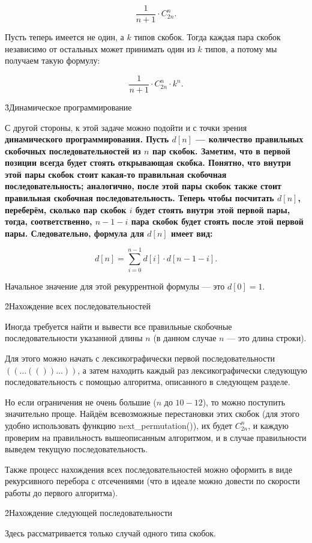 $$ \frac{1}{n+1} \cdot C^n_{2n}. $$

Пусть теперь имеется не один, а $k$ типов скобок. Тогда каждая пара скобок независимо от остальных может принимать один из $k$ типов, а потому мы получаем такую формулу:

$$ \frac{1}{n+1} \cdot C^n_{2n} \cdot k^n. $$

\h3{Динамическое программирование}

С другой стороны, к этой задаче можно подойти и с точки зрения \bf{динамического программирования}. Пусть $d[n]$ --- количество правильных скобочных последовательностей из $n$ пар скобок. Заметим, что в первой позиции всегда будет стоять открывающая скобка. Понятно, что внутри этой пары скобок стоит какая-то правильная скобочная последовательность; аналогично, после этой пары скобок также стоит правильная скобочная последовательность. Теперь чтобы посчитать $d[n]$, переберём, сколько пар скобок $i$ будет стоять внутри этой первой пары, тогда, соответственно, $n-1-i$ пара скобок будет стоять после этой первой пары. Следовательно, формула для $d[n]$ имеет вид:

$$ d[n] = \sum_{i=0}^{n-1} d[i] \cdot d[n-1-i]. $$

Начальное значение для этой рекуррентной формулы --- это $d[0] = 1$.


\h2{Нахождение всех последовательностей}

Иногда требуется найти и вывести все правильные скобочные последовательности указанной длины $n$ (в данном случае $n$ --- это длина строки).

Для этого можно начать с лексикографически первой последовательности $((\ldots(())\ldots))$, а затем находить каждый раз лексикографически следующую последовательность с помощью алгоритма, описанного в следующем разделе.

Но если ограничения не очень большие ($n$ до $10-12$), то можно поступить значительно проще. Найдём всевозможные перестановки этих скобок (для этого удобно использовать функцию next_permutation()), их будет $C_{2n}^n$, и каждую проверим на правильность вышеописанным алгоритмом, и в случае правильности выведем текущую последовательность.

Также процесс нахождения всех последовательностей можно оформить в виде рекурсивного перебора с отсечениями (что в идеале можно довести по скорости работы до первого алгоритма).


\h2{Нахождение следующей последовательности}

Здесь рассматривается только случай одного типа скобок.

